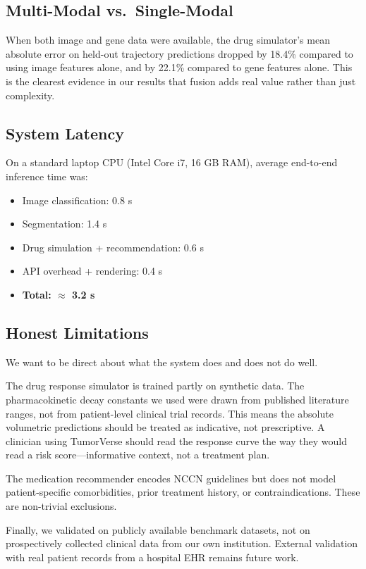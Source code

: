 \documentclass[conference]{IEEEtran}
\begin{document}
\subsection{Multi-Modal vs.\ Single-Modal}
When both image and gene data were available, the drug simulator's mean absolute error on held-out trajectory predictions dropped by 18.4\% compared to using image features alone, and by 22.1\% compared to gene features alone. This is the clearest evidence in our results that fusion adds real value rather than just complexity.

\subsection{System Latency}
On a standard laptop CPU (Intel Core i7, 16 GB RAM), average end-to-end inference time was:
\begin{itemize}
    \item Image classification: 0.8 s
    \item Segmentation: 1.4 s
    \item Drug simulation + recommendation: 0.6 s
    \item API overhead + rendering: 0.4 s
    \item \textbf{Total: $\approx$ 3.2 s}
\end{itemize}

\subsection{Honest Limitations}
We want to be direct about what the system does and does not do well.

The drug response simulator is trained partly on synthetic data. The pharmacokinetic decay constants we used were drawn from published literature ranges, not from patient-level clinical trial records. This means the absolute volumetric predictions should be treated as indicative, not prescriptive. A clinician using TumorVerse should read the response curve the way they would read a risk score—informative context, not a treatment plan.

The medication recommender encodes NCCN guidelines but does not model patient-specific comorbidities, prior treatment history, or contraindications. These are non-trivial exclusions.

Finally, we validated on publicly available benchmark datasets, not on prospectively collected clinical data from our own institution. External validation with real patient records from a hospital EHR remains future work.
\end{document}
